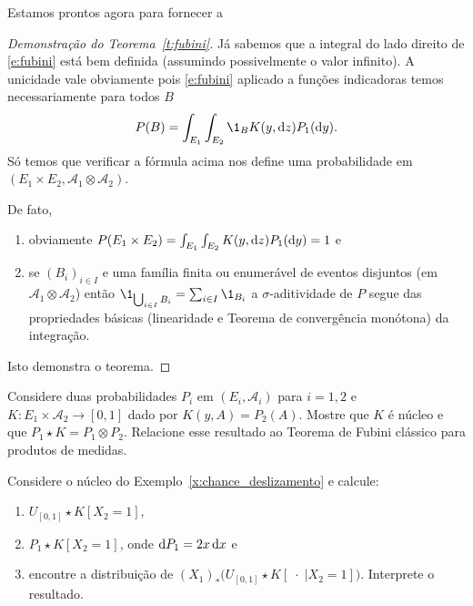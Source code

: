 Estamos prontos agora para fornecer a
\begin{proof}[Demonstração do Teorema~\ref{t:fubini}]
  Já sabemos que a integral do lado direito de \eqref{e:fubini} está bem definida (assumindo possivelmente o valor infinito).
  A unicidade vale obviamente pois \eqref{e:fubini} aplicado a funções indicadoras temos necessariamente para todos $B$
\begin{equation}
    P(B) = \int_{E_1} \int_{E_2} \1_{B} K(y, \d z) P_1 (\d y).
  \end{equation}
  Só temos que verificar a fórmula acima nos define uma probabilidade em $(E_1 \times E_2, \mathcal{A}_1 \otimes \mathcal{A}_2)$.

  De fato,
  \begin{enumerate}[\quad a)]
  \item obviamente $P(E_1 \times E_2) = \int_{E_1} \int_{E_2}  K(y, \mathop{}\!\mathrm{d} z) P_1(\mathop{}\!\mathrm{d} y) = 1$ e
  \item se $(B_i)_{i\in I}$ e uma família finita ou enumerável de eventos disjuntos (em $\mathcal{A}_1 \otimes \mathcal{A}_2$) então
  $\1_{\bigcup_{i\in I} B_i}=\sum_{i\in I} \1_{B_i}$ a $\sigma$-aditividade de $P$ segue das propriedades básicas
  (linearidade e Teorema de convergência monótona) da integração.
  \end{enumerate}
  Isto demonstra o teorema.
\end{proof}

\begin{exercise}
  \label{x:nucleo_constante}
  Considere duas probabilidades $P_i$ em $(E_i, \mathcal{A}_i)$ para $i = 1,2$ e $K:E_1 \times \mathcal{A}_2 \to [0,1]$ dado por $K(y,A) = P_2(A)$.
  Mostre que $K$ é núcleo e que $P_1 \star K = P_1 \otimes P_2$.
  Relacione esse resultado ao Teorema de Fubini clássico para produtos de medidas.
\end{exercise}

\begin{exercise}
  Considere o núcleo do Exemplo~\ref{x:chance_deslizamento} e calcule:
  \begin{enumerate}[\quad a)]
  \item $U_{[0,1]} \star K [X_2 = 1]$,
  \item $P_1 \star K [X_2 = 1]$, onde $\mathop{}\!\mathrm{d} P_1 = 2x \mathop{}\!\mathrm{d} x$ e
  \item encontre a distribuição de $(X_1)_* \big( U_{[0,1]} \star K [\; \cdot \; | X_2 = 1] \big)$. Interprete o resultado.
  \end{enumerate}
\end{exercise}

